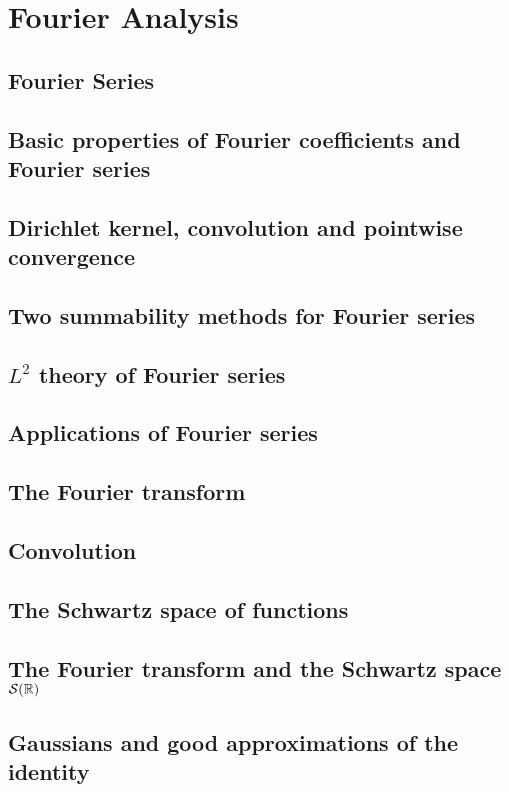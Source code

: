 \chapter{Fourier Analysis}\label{cha:fourier-analysis}

\section{Fourier Series}

\section{Basic properties of Fourier coefficients and Fourier series}

\section{Dirichlet kernel, convolution and pointwise convergence}

\section{Two summability methods for Fourier series}

\section{\(L^{2}\) theory of Fourier series}

\section{Applications of Fourier series}

\section{The Fourier transform}

\section{Convolution}

\section{The Schwartz space of functions}

\section{The Fourier transform and the Schwartz space \(\mathcal S (\mathbb{R})\)}

\section{Gaussians and good approximations of the identity}

